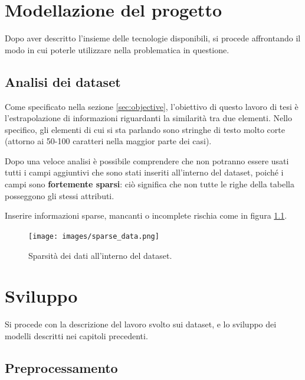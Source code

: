 \documentclass[12pt,a4paper,twoside,openright]{book}
\begin{document}

\chapter{Modellazione del progetto}

Dopo aver descritto l'insieme delle tecnologie disponibili, si procede affrontando il modo in cui poterle utilizzare nella problematica in questione.

\section{Analisi dei dataset}

Come specificato nella sezione \ref{sec:objective}, l'obiettivo di questo lavoro di tesi è l'estrapolazione di informazioni riguardanti la similarità tra due elementi. Nello specifico, gli elementi di cui si sta parlando sono stringhe di testo molto corte (attorno ai 50-100 caratteri nella maggior parte dei casi).

Dopo una veloce analisi è possibile comprendere che non potranno essere usati tutti i campi aggiuntivi che sono stati inseriti all'interno del dataset, poiché i campi sono \textbf{fortemente sparsi}: ciò significa che non tutte le righe della tabella posseggono gli stessi attributi.

Inserire informazioni sparse, mancanti o incomplete rischia come in figura \ref{fig:sparse_dataset}. 

\begin{figure}[H]
    \centering
    \texttt{[image: images/sparse\_data.png]}
    \caption{Sparsità dei dati all'interno del dataset.}
    \label{fig:sparse_dataset}
\end{figure}


\chapter{Sviluppo}

Si procede con la descrizione del lavoro svolto sui dataset, e lo sviluppo dei modelli descritti nei capitoli precedenti.

\section{Preprocessamento}
\end{document}
